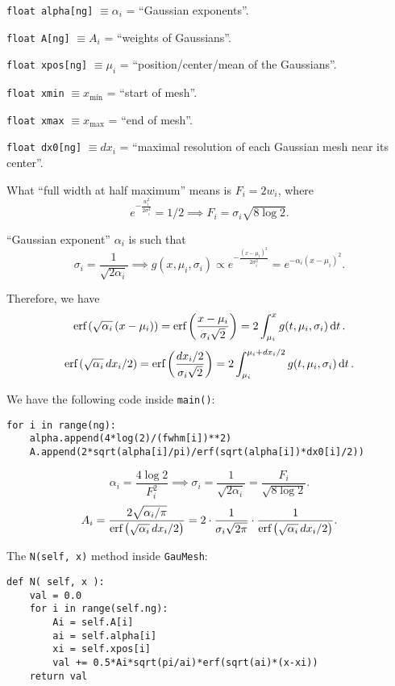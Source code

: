 \documentclass[a4paper,fleqn,12pt]{article}
\begin{document}
\texttt{float alpha[ng]} $\equiv \alpha_i$ = ``Gaussian exponents''.

\texttt{float A[ng]} $\equiv A_i$ = ``weights of Gaussians''.

\texttt{float xpos[ng]} $\equiv \mu_i$ = ``position/center/mean of the Gaussians''.

\texttt{float xmin} $\equiv x_{\text{min}}$ = ``start of mesh''.

\texttt{float xmax} $\equiv x_{\text{max}}$ = ``end of mesh''.

\texttt{float dx0[ng]} $\equiv dx_i$ = ``maximal resolution of each Gaussian mesh near its center''.

\n

What ``full width at half maximum'' means is $F_i = 2 w_i$, where
$$
e^{- \frac{w_i^2}{2\sigma_i^2}} = 1/2 \implies
\boxed{ F_i = \sigma_i \sqrt{8 \log 2}. }
$$

``Gaussian exponent'' $\alpha_i$ is such that
$$
\sigma_i = \frac{1}{\sqrt{2\alpha_i}} \implies
\boxed{ g(x, \mu_i, \sigma_i) \propto
e^{- \frac{(x-\mu_i)^2}{2\sigma_i^2}} = e^{-\alpha_i (x - \mu_i)^2}. }
$$

Therefore, we have
$$
\text{erf}\left(\sqrt{\alpha_i}\,(x-\mu_i)\right) = \text{erf}\left(\frac{x-\mu_i}{\sigma_i\sqrt{2}}\right) =
2 \int_{\mu_i}^x g(t, \mu_i, \sigma_i) \dd{t}.
$$
$$
\text{erf}\left(\sqrt{\alpha_i} \, dx_i/2\right) = \text{erf}\left(\frac{dx_i/2}{\sigma_i\sqrt{2}}\right) =
2 \int_{\mu_i}^{\mu_i + dx_i/2} g(t, \mu_i, \sigma_i) \dd{t}.
$$

\n

We have the following code inside \texttt{main()}:
\begin{verbatim}
for i in range(ng):
    alpha.append(4*log(2)/(fwhm[i])**2)
    A.append(2*sqrt(alpha[i]/pi)/erf(sqrt(alpha[i])*dx0[i]/2))
\end{verbatim}

$$
\alpha_i = \frac{4 \log 2}{F_i^2} \implies
\boxed{ \sigma_i = \frac{1}{\sqrt{2\alpha_i}} = \frac{F_i}{\sqrt{8 \log 2}}. }
$$
$$
A_i = \frac{2 \sqrt{\alpha_i / \pi}}{\text{erf}\left(\sqrt{\alpha_i} \, dx_i / 2\right)} =
2 \cdot \frac{1}{\sigma_i \sqrt{2\pi}} \cdot
\frac{1}{\text{erf}\left(\sqrt{\alpha_i} \, dx_i / 2\right)}.
$$

The \texttt{N(self, x)} method inside \texttt{GauMesh}:
\begin{verbatim}
def N( self, x ):
    val = 0.0
    for i in range(self.ng):
        Ai = self.A[i]
        ai = self.alpha[i]
        xi = self.xpos[i]
        val += 0.5*Ai*sqrt(pi/ai)*erf(sqrt(ai)*(x-xi))
    return val
\end{verbatim}
\end{document}
